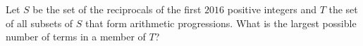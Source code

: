 Let $S$ be the set of the reciprocals of the first $2016$ positive integers and $T$ the set of all subsets of $S$ that form arithmetic progressions. What is the largest possible number of terms in a member of $T$?